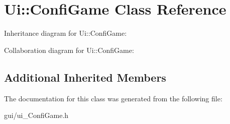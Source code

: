 \hypertarget{class_ui_1_1_confi_game}{}\section{Ui\+:\+:Confi\+Game Class Reference}
\label{class_ui_1_1_confi_game}


Inheritance diagram for Ui\+:\+:Confi\+Game\+:


Collaboration diagram for Ui\+:\+:Confi\+Game\+:
\subsection*{Additional Inherited Members}


The documentation for this class was generated from the following file\+:\begin{DoxyCompactItemize}
\item 
gui/ui\+\_\+\+Confi\+Game.\+h\end{DoxyCompactItemize}
